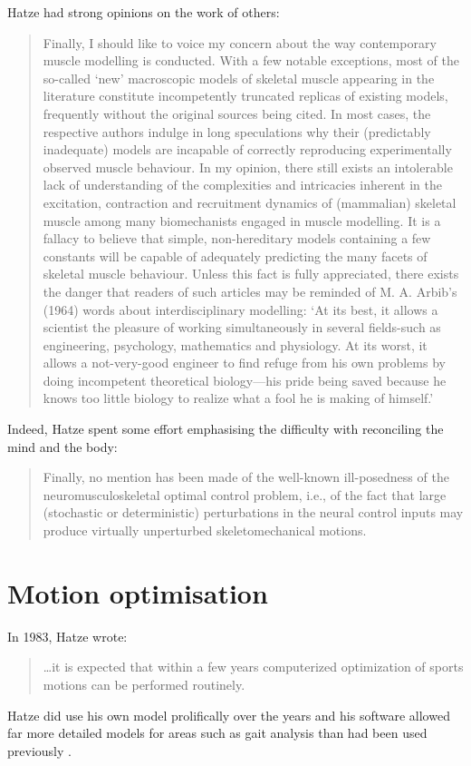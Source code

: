 \documentclass[a4paper]{article}
\begin{document}
Hatze had strong opinions on the work of others:
\begin{quote}
Finally, I should like to voice my concern about the way contemporary muscle modelling is conducted.
With a few notable exceptions, most of the so-called `new' macroscopic models of skeletal muscle appearing in the literature constitute incompetently truncated replicas of existing models, frequently without the original sources being cited.
In most cases, the respective authors indulge in long speculations why their (predictably inadequate) models are incapable of correctly reproducing experimentally observed muscle behaviour.
In my opinion, there still exists an intolerable lack of understanding of the complexities and intricacies inherent in the excitation, contraction and recruitment dynamics of (mammalian) skeletal muscle among many biomechanists engaged in muscle modelling.
It is a fallacy to believe that simple, non-hereditary models containing a few constants will be capable of adequately predicting the many facets of skeletal muscle behaviour.
Unless this fact is fully appreciated, there exists the danger that readers of such articles may be reminded of M. A. Arbib’s (1964) words about interdisciplinary modelling:
`At its best, it allows a scientist the pleasure of working simultaneously in several fields-such as engineering, psychology, mathematics and physiology. At its worst, it allows a not-very-good engineer to find refuge from his own problems by doing incompetent theoretical biology---his pride being saved because he knows too little biology to realize what a fool he is making of himself.'
\parencite{hatze1988-biomech-letter}
\end{quote}
Indeed, Hatze spent some effort emphasising the difficulty with reconciling the mind and the body:
\begin{quote}
Finally, no mention has been made of the well-known ill-posedness of the neuromusculoskeletal optimal control problem, i.e., of the fact that large (stochastic or deterministic) perturbations in the neural control inputs may produce virtually unperturbed skeletomechanical motions.
\parencite{hatze1988-biomech-letter}
\end{quote}

\section{Motion optimisation}

In 1983, Hatze wrote:
\begin{quote}
\dots it is expected that within a few years computerized optimization of sports motions can be performed routinely.
\parencite{hatze1983-jss}
\end{quote}
Hatze did use his own model prolifically over the years and his software allowed far more detailed models for areas such as gait analysis than had been used previously \parencite{hatze1987-jmb}.
\end{document}
